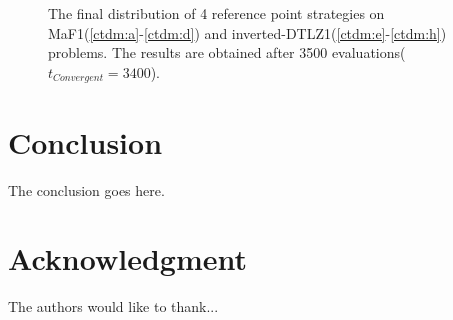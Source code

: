 \documentclass[conference]{IEEEtran}
\begin{document}
\begin{figure}[!t]
  \quad
  \\
  \quad
  \\
  \caption{
    The final distribution of 4 reference point strategies on MaF1(\ref{ctdm:a}-\ref{ctdm:d})
    and inverted-DTLZ1(\ref{ctdm:e}-\ref{ctdm:h}) problems.
    The results are obtained after 3500 evaluations($t_{Convergent} = 3400$).
  }
  \label{ctdm}
\end{figure} 
\section{Conclusion}
The conclusion goes here.


\section*{Acknowledgment}


The authors would like to thank...\cite{IEEEhowto:kopka1}


 
 
\end{document}
